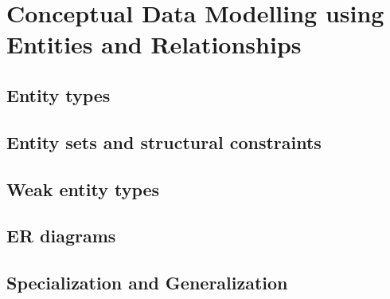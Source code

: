 \documentclass{article}
\begin{document}
	\section{Conceptual Data Modelling using Entities and Relationships}
	\subsection{Entity types}
	\subsection{Entity sets and structural constraints}
	\subsection{Weak entity types}
	\subsection{ER diagrams}
	\subsection{Specialization and Generalization}
\end{document}
